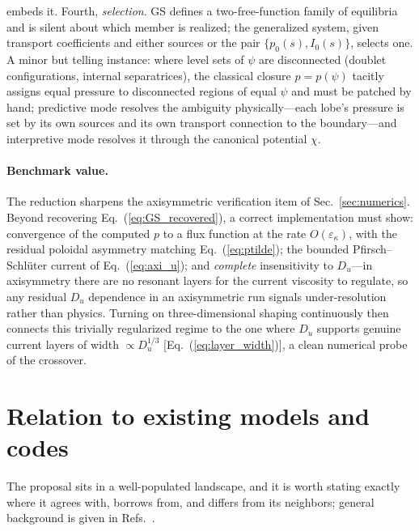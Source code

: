 \documentclass[english]{article}
\begin{document}
embeds it. Fourth, \emph{selection}. GS defines a two-free-function family of equilibria and is
silent about which member is realized; the generalized system, given transport coefficients and
either sources or the pair $\{p_0(s),I_0(s)\}$, selects one. A minor but telling instance: where
level sets of $\psi$ are disconnected (doublet configurations, internal separatrices), the
classical closure $p=p(\psi)$ tacitly assigns equal pressure to disconnected regions of equal
$\psi$ and must be patched by hand; predictive mode resolves the ambiguity physically---each
lobe's pressure is set by its own sources and its own transport connection to the boundary---and
interpretive mode resolves it through the canonical potential $\chi$.

\paragraph{Benchmark value.}
The reduction sharpens the axisymmetric verification item of Sec.~\ref{sec:numerics}. Beyond
recovering Eq.~(\ref{eq:GS_recovered}), a correct implementation must show: convergence of the
computed $p$ to a flux function at the rate $O(\varepsilon_\kappa)$, with the residual poloidal
asymmetry matching Eq.~(\ref{eq:ptilde}); the bounded Pfirsch--Schl\"uter current of
Eq.~(\ref{eq:axi_u}); and \emph{complete} insensitivity to $D_u$---in axisymmetry there are no
resonant layers for the current viscosity to regulate, so any residual $D_u$ dependence in an
axisymmetric run signals under-resolution rather than physics. Turning on three-dimensional
shaping continuously then connects this trivially regularized regime to the one where $D_u$
supports genuine current layers of width $\propto D_u^{1/3}$
[Eq.~(\ref{eq:layer_width})], a clean numerical probe of the crossover.


\section{Relation to existing models and codes}
\label{sec:relation}

The proposal sits in a well-populated landscape, and it is worth stating exactly where it agrees
with, borrows from, and differs from its neighbors; general background is given in
Refs.~\cite{helander2014,boozer2004}.
\end{document}
